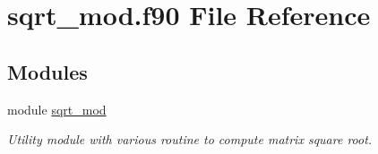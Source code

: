 \hypertarget{sqrt__mod_8f90}{}\section{sqrt\+\_\+mod.\+f90 File Reference}
\label{sqrt__mod_8f90}
\subsection*{Modules}
\begin{DoxyCompactItemize}
\item 
module \hyperlink{namespacesqrt__mod}{sqrt\+\_\+mod}
\begin{DoxyCompactList}\small\item\em Utility module with various routine to compute matrix square root. \end{DoxyCompactList}\end{DoxyCompactItemize}

